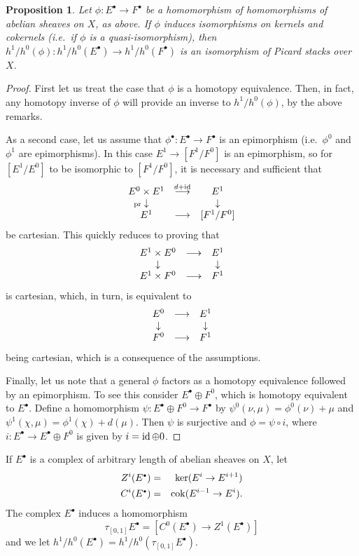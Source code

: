 \documentclass[11pt]{article}
\theoremstyle{plain}
\newtheorem{prop}{Proposition}[section]
\theoremstyle{definition}
\newenvironment{pf}{\begin{proof}}{\end{proof}}
\newcommand{\com}{^{\scriptscriptstyle\bullet}}
\newcommand{\pr}{\mathop{\rm pr}\nolimits}
\newcommand{\cok}{\mathop{\rm cok}}
\newcommand{\id}{\mathop{\rm id}}
\newcommand{\comp}{\mathbin{{\scriptstyle\circ}}}
\newcommand{\ldiag}[1]
       {\makebox[0cm]{\({\scriptstyle#1}\downarrow\phantom{\scriptstyle#1}\)}}
\newcommand{\rdiag}[1]
       {\makebox[0cm]{\(\phantom{\scriptstyle#1}\downarrow{\scriptstyle#1}\)}}
\newcommand{\comdia}[9]{
\begin{array}{ccc}
#1 & \stackrel{#2}{\longrightarrow} & #3 \\
\ldiag{#4} & #5 & \rdiag{#6} \\
#7 & \stackrel{#8}{\longrightarrow} & #9
\end{array}}
\theoremstyle{plain}
\theoremstyle{definition}
\theoremstyle{remark}
\begin{document}
\begin{prop} \label{tpifs}
Let \(\phi:E\com\rightarrow F\com\) be a homomorphism of homomorphisms
of abelian sheaves on \(X\), as above. If \(\phi\) induces isomorphisms on
kernels and cokernels (i.e.\ if \(\phi\) is a quasi-isomorphism), then
\(h^1/h^0(\phi):h^1/h^0(E\com)\rightarrow h^1/h^0(F\com)\) is an
isomorphism of Picard stacks over \(X\).
\end{prop}
\begin{pf}
First let us treat the case that \(\phi\) is a homotopy equivalence.
Then, in fact, any homotopy inverse of \(\phi\) will provide an inverse
to \(h^1/h^0(\phi)\), by the above remarks.

As a second case, let us assume that \(\phi\com:E\com\rightarrow F\com\) is an
epimorphism (i.e.\
\(\phi^0\) and \(\phi^1\) are epimorphisms). In this case \(E^1\rightarrow[F^1/F^0]\)
is an epimorphism, so for \([E^1/E^0]\) to be isomorphic to \([F^1/F^0]\), it is
necessary and sufficient that
\[
\comdia{E^0\times E^1}{d+\id}{E^1}{\pr}{}{}{E^1}{}{[F^1/F^0]}
\]
be cartesian.
This quickly reduces to proving that
\[
\comdia{E^1\times E^0}{}{E^1}{}{}{}{E^1\times F^0}{}{F^1}
\]
is cartesian,
which, in turn, is equivalent to
\[
\comdia{E^0}{}{E^1}{}{}{}{F^0}{}{F^1}
\]
being cartesian, which is a
consequence of the assumptions.

Finally, let us note that a general \(\phi\) factors as a homotopy equivalence
followed by an epimorphism. To see this consider \(E\com\oplus F^0\), which is
homotopy equivalent to \(E\com\). Define a homomorphism \(\psi:E\com\oplus
F^0\rightarrow F\com\) by \(\psi^0(\nu,\mu)=\phi^0(\nu)+\mu\) and
\(\psi^1(\chi,\mu)=\phi^1(\chi)+d(\mu)\). Then \(\psi\) is surjective and
\(\phi=\psi\comp i\), where
\(i:E\com\rightarrow E\com\oplus F^0\) is given by \(i=\id\oplus 0\).
\end{pf}

If \(E\com\) is a complex of arbitrary length of abelian sheaves on \(X\), let
\begin{eqnarray*} Z^i(E\com) & = & \ker(E^i\rightarrow E^{i+1}) \\ C^i(E\com) &
= & \cok(E^{i-1}\rightarrow E^i).
\end{eqnarray*} The complex \(E\com\) induces a homomorphism
\[
\tau_{[0,1]} E\com=[C^0(E\com)\rightarrow Z^1(E\com)]
\]
and we let
\(h^1/h^0(E\com)=h^1/h^0(\tau_{[0,1]}E\com)\).
\end{document}
